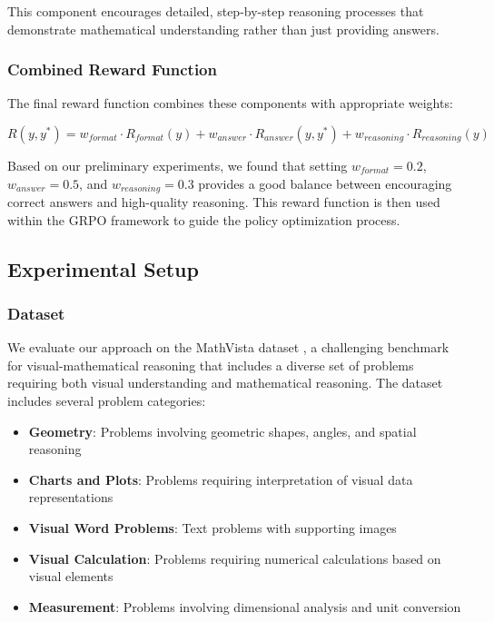 \documentclass[11pt,a4paper]{article}
\begin{document}
This component encourages detailed, step-by-step reasoning processes that demonstrate mathematical understanding rather than just providing answers.

\subsubsection{Combined Reward Function}

The final reward function combines these components with appropriate weights:

\begin{equation}
R(y, y^*) = w_{format} \cdot R_{format}(y) + w_{answer} \cdot R_{answer}(y, y^*) + w_{reasoning} \cdot R_{reasoning}(y)
\end{equation}

Based on our preliminary experiments, we found that setting $w_{format} = 0.2$, $w_{answer} = 0.5$, and $w_{reasoning} = 0.3$ provides a good balance between encouraging correct answers and high-quality reasoning. This reward function is then used within the GRPO framework to guide the policy optimization process.

\subsection{Experimental Setup}

\subsubsection{Dataset}

We evaluate our approach on the MathVista dataset \cite{mathvista2023}, a challenging benchmark for visual-mathematical reasoning that includes a diverse set of problems requiring both visual understanding and mathematical reasoning. The dataset includes several problem categories:

\begin{itemize}
    \item \textbf{Geometry}: Problems involving geometric shapes, angles, and spatial reasoning
    \item \textbf{Charts and Plots}: Problems requiring interpretation of visual data representations
    \item \textbf{Visual Word Problems}: Text problems with supporting images
    \item \textbf{Visual Calculation}: Problems requiring numerical calculations based on visual elements
    \item \textbf{Measurement}: Problems involving dimensional analysis and unit conversion
\end{itemize}
\end{document}
